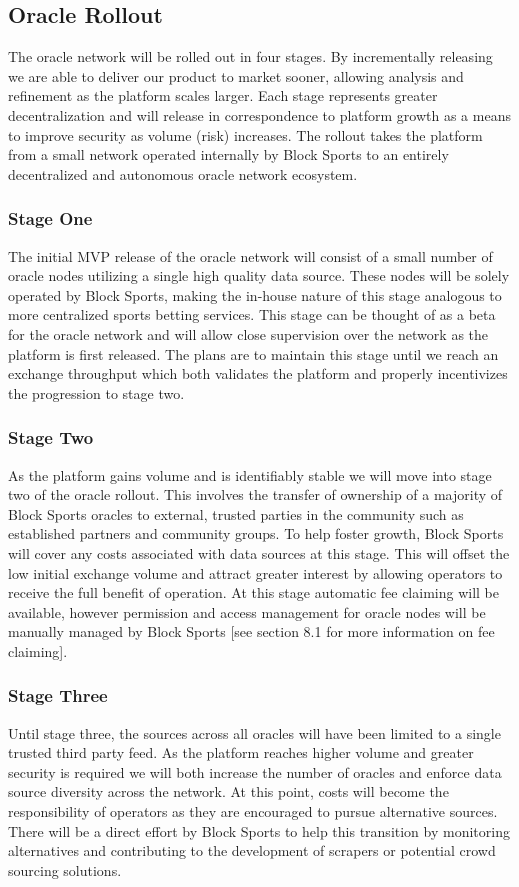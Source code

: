 \documentclass{article}
\begin{document}
	\subsection{Oracle Rollout}
The oracle network will be rolled out in four stages. By incrementally releasing we are able to deliver our product to market sooner, allowing analysis and refinement as the platform scales larger. Each stage represents greater decentralization and will release in correspondence to platform growth as a means to improve security as volume (risk) increases. The rollout takes the platform from a small network operated internally by Block Sports to an entirely decentralized and autonomous oracle network ecosystem. 

		\subsubsection{Stage One}
		The initial MVP release of the oracle network will consist of a small number of oracle nodes utilizing a single high quality data source. These nodes will be solely operated by Block Sports, making the in-house nature of this stage analogous to more centralized sports betting services. This stage can be thought of as a beta for the oracle network and will allow close supervision over the network as the platform is first released. The plans are to maintain this stage until we reach an exchange throughput which both validates the platform and properly incentivizes the progression to stage two.
		
		\subsubsection{Stage Two}
		As the platform gains volume and is identifiably stable we will move into stage two of the oracle rollout. This involves the transfer of ownership of a majority of Block Sports oracles to external, trusted parties in the community such as established partners and community groups. To help foster growth, Block Sports will cover any costs associated with data sources at this stage. This will offset the low initial exchange volume and attract greater interest by allowing operators to receive the full benefit of operation. At this stage automatic fee claiming will be available, however permission and access management for oracle nodes will be manually managed by Block Sports [see section 8.1 for more information on fee claiming].

		\subsubsection{Stage Three}
		Until stage three, the sources across all oracles will have been limited to a single trusted third party feed. As the platform reaches higher volume and greater security is required we will both increase the number of oracles and enforce data source diversity across the network. At this point, costs will become the responsibility of operators as they are encouraged to pursue alternative sources. There will be a direct effort by Block Sports to help this transition by monitoring alternatives and contributing to the development of scrapers or potential crowd sourcing solutions.
		
\end{document}
